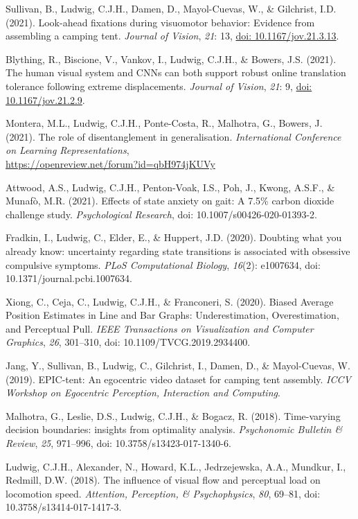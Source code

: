 \documentclass[a4paper, 10pt]{article}
\renewenvironment{itemize}{
  \begin{list}{}{
    \setlength{\leftmargin}{1.5em}
  }
}{
  \end{list}
}
\begin{document}
\begin{itemize}
\item Sullivan, B., Ludwig, C.J.H., Damen, D., Mayol-Cuevas, W., \& Gilchrist, I.D. (2021). Look-ahead fixations during visuomotor behavior: Evidence from assembling a camping tent. \textit{Journal of Vision}, \textit{21}: 13, \href{https://doi.org/10.1167/jov.21.3.13}{doi: 10.1167/jov.21.3.13}.
\item Blything, R., Biscione, V., Vankov, I., Ludwig, C.J.H., \& Bowers, J.S. (2021). The human visual system and CNNs can both support robust online translation tolerance following extreme displacements. \textit{Journal of Vision}, \textit{21}: 9, \href{https://doi.org/10.1167/jov.21.2.9}{doi: 10.1167/jov.21.2.9}.
\item Montera, M.L., Ludwig, C.J.H., Ponte-Costa, R., Malhotra, G., Bowers, J. (2021). The role of disentanglement in generalisation. \textit{International Conference on Learning Representations},\\\href{https://openreview.net/forum?id=qbH974jKUVy}{https://openreview.net/forum?id=qbH974jKUVy}
\item Attwood, A.S., Ludwig, C.J.H., Penton-Voak, I.S., Poh, J., Kwong, A.S.F., \& Munaf{\`o}, M.R. (2021). Effects of state anxiety on gait: A 7.5\% carbon dioxide challenge study. \textit{Psychological Research}, doi: 10.1007/s00426-020-01393-2.
\item Fradkin, I., Ludwig, C., Elder, E., \& Huppert, J.D. (2020). Doubting what you already know: uncertainty regarding state transitions is associated with obsessive compulsive symptoms. \textit{PLoS Computational Biology}, \textit{16}(2): e1007634, doi: 10.1371/journal.pcbi.1007634.
\item Xiong, C., Ceja, C., Ludwig, C.J.H., \& Franconeri, S. (2020). Biased Average Position Estimates in Line and Bar Graphs: Underestimation, Overestimation, and Perceptual Pull. \textit{IEEE Transactions on Visualization and Computer Graphics}, \textit{26}, 301--310, doi: 10.1109/TVCG.2019.2934400.
\item Jang, Y., Sullivan, B., Ludwig, C., Gilchrist, I., Damen, D., \& Mayol-Cuevas, W. (2019). EPIC-tent: An egocentric video dataset for camping tent assembly. \textit{ICCV Workshop on Egocentric Perception, Interaction and Computing}.
\item Malhotra, G., Leslie, D.S., Ludwig, C.J.H., \& Bogacz, R. (2018). Time-varying decision boundaries: insights from optimality analysis. \textit{Psychonomic Bulletin \& Review}, \textit{25}, 971--996, doi: 10.3758/s13423-017-1340-6.
\item Ludwig, C.J.H., Alexander, N., Howard, K.L., Jedrzejewska, A.A., Mundkur, I., Redmill, D.W. (2018). The influence of visual flow and perceptual load on locomotion speed. \textit{Attention, Perception, \& Psychophysics}, \textit{80}, 69--81, doi: 10.3758/s13414-017-1417-3.

\end{itemize}
\end{document}
